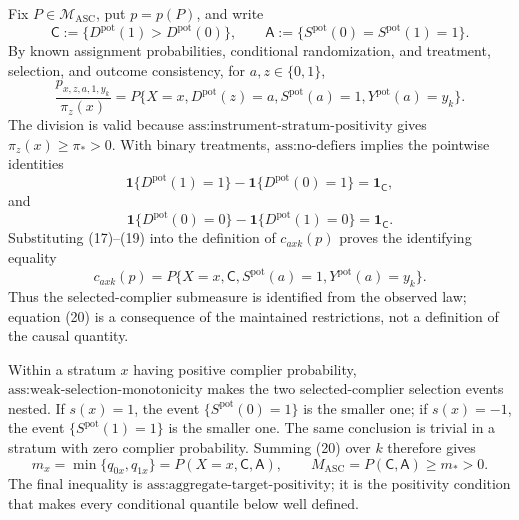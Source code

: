 Fix \(P\in\mathcal M_{\mathrm{ASC}}\), put \(p=p(P)\), and write
\[
 \mathsf C
 :=\{D^{\mathrm{pot}}(1)>D^{\mathrm{pot}}(0)\},
 \qquad
 \mathsf A
 :=\{S^{\mathrm{pot}}(0)=S^{\mathrm{pot}}(1)=1\}.
\]
By known assignment probabilities, conditional randomization, and
treatment, selection, and outcome consistency, for
\(a,z\in\{0,1\}\),
\[
 \frac{p_{x,z,a,1,y_k}}{\pi_z(x)}
 =
 P\{X=x,D^{\mathrm{pot}}(z)=a,S^{\mathrm{pot}}(a)=1,
       Y^{\mathrm{pot}}(a)=y_k\}.
\tag{17}
\]
The division is valid because
\(\text{ass:instrument-stratum-positivity}\) gives
\(\pi_z(x)\geq\pi_*>0\).  With binary treatments,
\(\text{ass:no-defiers}\) implies the pointwise identities
\[
 \mathbf 1\{D^{\mathrm{pot}}(1)=1\}
 -\mathbf 1\{D^{\mathrm{pot}}(0)=1\}
 =\mathbf 1_{\mathsf C},
\tag{18}
\]
and
\[
 \mathbf 1\{D^{\mathrm{pot}}(0)=0\}
 -\mathbf 1\{D^{\mathrm{pot}}(1)=0\}
 =\mathbf 1_{\mathsf C}.
\tag{19}
\]
Substituting (17)--(19) into the definition of \(c_{axk}(p)\) proves
the identifying equality
\[
 c_{axk}(p)
 =P\{X=x,\mathsf C,S^{\mathrm{pot}}(a)=1,
       Y^{\mathrm{pot}}(a)=y_k\}.
\tag{20}
\]
Thus the selected-complier submeasure is identified from the observed
law; equation (20) is a consequence of the maintained restrictions,
not a definition of the causal quantity.

Within a stratum \(x\) having positive complier probability,
\(\text{ass:weak-selection-monotonicity}\) makes the two
selected-complier selection events nested.  If \(s(x)=1\), the event
\(\{S^{\mathrm{pot}}(0)=1\}\) is the smaller one; if \(s(x)=-1\), the
event \(\{S^{\mathrm{pot}}(1)=1\}\) is the smaller one.  The same
conclusion is trivial in a stratum with zero complier probability.
Summing (20) over \(k\) therefore gives
\[
 m_x=\min\{q_{0x},q_{1x}\}
 =P(X=x,\mathsf C,\mathsf A),
 \qquad
 M_{\mathrm{ASC}}=P(\mathsf C,\mathsf A)\geq m_*>0.
\tag{21}
\]
The final inequality is
\(\text{ass:aggregate-target-positivity}\); it is the positivity
condition that makes every conditional quantile below well defined.

